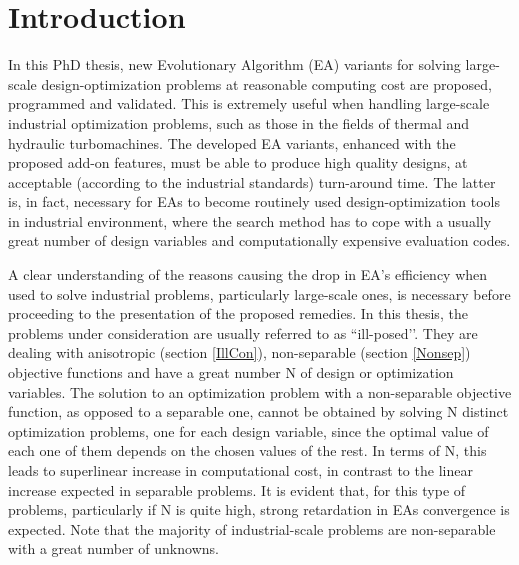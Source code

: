 
\chapter{Introduction}

\ifpdf
    \graphicspath{{1_introduction/figures/PNG/}{1_introduction/figures/PDF/}{1_introduction/figures/}}
\else
    \graphicspath{{1_introduction/figures/EPS/}{1_introduction/figures/}}
\fi

In this PhD thesis, new Evolutionary Algorithm (EA) variants for solving large-scale design-optimization problems at reasonable computing cost are proposed, programmed and validated. This is extremely useful when handling large-scale industrial optimization problems, such as those in the fields of thermal and hydraulic turbomachines. The developed EA variants, enhanced with the proposed add-on features, must be able to produce high quality designs, at acceptable (according to the industrial standards) turn-around time. The latter is, in fact, necessary for EAs to become routinely used design-optimization tools in industrial environment, where the search method has to cope with a usually great number of design variables and computationally expensive evaluation codes.
 
A clear understanding of the reasons causing the drop in EA’s efficiency when used to solve industrial problems, particularly large-scale ones, is necessary before proceeding to the presentation of the proposed remedies. In this thesis, the problems under consideration are usually referred to as ``ill-posed’’. They are dealing with anisotropic (section \ref{IllCon}), non-separable (section \ref{Nonsep}) objective functions and have a great number N of design or optimization variables. The solution to an optimization problem  with a non-separable objective function, as opposed to a separable one, cannot be obtained by solving N distinct optimization problems, one for each design variable, since the optimal value of each one of them depends on the chosen values of the rest. In terms of N, this leads to superlinear increase in computational cost, in contrast to the linear increase expected in separable problems. It is evident that, for this type of problems, particularly if N is quite high, strong retardation in EAs convergence is expected. Note that the majority of industrial-scale problems are non-separable with a great number of unknowns.
 
